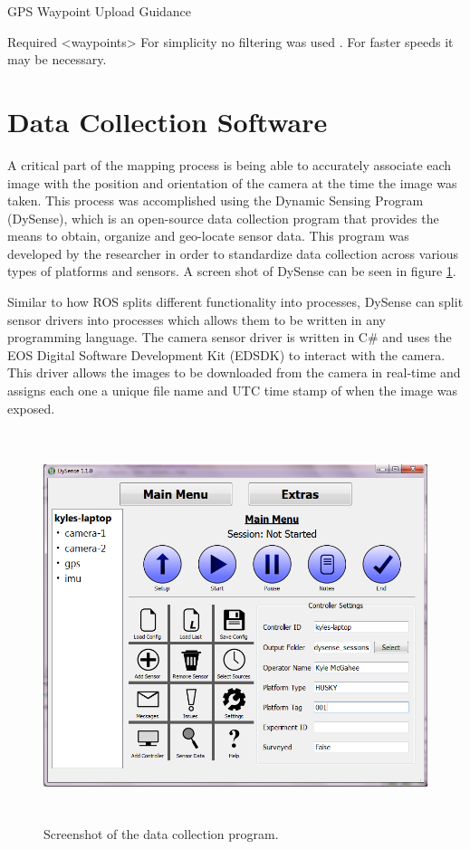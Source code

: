 GPS
Waypoint Upload
Guidance

Required <waypoints>
For simplicity no filtering was used . For faster speeds it may be necessary.

\section{Data Collection Software}
\label{system-software}

A critical part of the mapping process is being able to accurately associate each image with the position and orientation of the camera at the time the image was taken.  This process was accomplished using the Dynamic Sensing Program (DySense), which is an open-source data collection program that provides the means to obtain, organize and geo-locate sensor data.  This program was developed by the researcher in order to standardize data collection across various types of platforms and sensors.  A screen shot of DySense can be seen in figure \ref{dysense_screenshot}.

Similar to how ROS splits different functionality into processes, DySense can split sensor drivers into processes which allows them to be written in any programming language.  The camera sensor driver is written in C\# and uses the EOS Digital Software Development Kit (EDSDK) to interact with the camera.  This driver allows the images to be downloaded from the camera in real-time and assigns each one a unique file name and UTC time stamp of when the image was exposed.

\begin{figure}[htb]
	\centering
    \includegraphics[height=4.5in]{figures/dysense2.png}
    \caption[Data collection program]{Screenshot of the data collection program.}
    \label{dysense_screenshot}
\end{figure}

